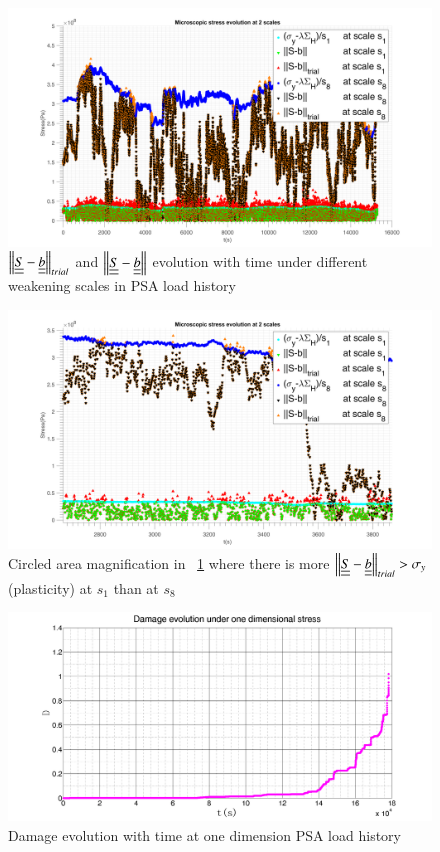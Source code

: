 \documentclass[3p,times,number,review]{elsarticle}
\newcommand{\figref}[1]{\figurename~\ref{#1}}
\begin{document}
\begin{figure}[!h]
	\centering
	\includegraphics[width=\textwidth]{figures//trialreal1d1.png} 
	\caption{$\left\|  \uline{\uline{S}}-\uline{\uline{b}}\right\|_{trial}$ and $\left\|  \uline{\uline{S}}-\uline{\uline{b}}\right\|$ evolution with time under different weakening scales in PSA load history}
	\label{trialreal}
\end{figure}
\begin{figure}[!h]
	\centering
	\includegraphics[width=\textwidth]{figures//trialreal1d2.png} 
	\caption{Circled area magnification in \figref{trialreal} where there is more $\left\|  \uline{\uline{S}}-\uline{\uline{b}}\right\|_{trial}>\sigma_y$(plasticity)  at $s_1$ than at $s_8$}
	\label{trialreal1d2}
\end{figure}
\begin{figure}[!h]
	\centering
	\includegraphics[width=\textwidth]{figures//damage1d.png} 
	\caption{Damage evolution with time at one dimension PSA load history}
	\label{damage1d}
\end{figure}
\end{document}
